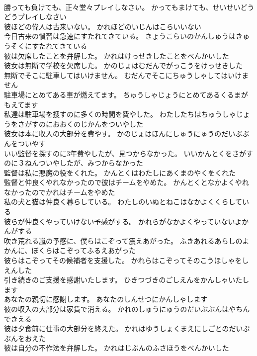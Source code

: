 \documentclass[8pt]{extreport}
\begin{document}
\begin{CJK}{UTF8}{min}
\\	勝っても負けても、正々堂々プレイしなさい。	かってもまけても、せいせいどうどうプレイしなさい 
\\	彼ほどの偉人は古来いない。	かれほどのいじんはこらいいない 
\\	今日古来の慣習は急速にすたれてきている。	きょうこらいのかんしゅうはきゅうそくにすたれてきている 
\\	彼は欠席したことを弁解した。	かれはけっせきしたことをべんかいした 
\\	彼女は無断で学校を欠席した。	かのじょはむだんでがっこうをけっせきした 
\\	無断でそこに駐車してはいけません。	むだんでそこにちゅうしゃしてはいけません 
\\	駐車場にとめてある車が燃えてます。	ちゅうしゃじょうにとめてあるくるまがもえてます 
\\	私達は駐車場を捜すのに多くの時間を費やした。	わたしたちはちゅうしゃじょうをさがすのにおおくのじかんをついやした 
\\	彼女は本に収入の大部分を費やす。	かのじょはほんにしゅうにゅうのだいぶぶんをついやす 
\\	いい監督を探すのに3年費やしたが、見つからなかった。	いいかんとくをさがすのに３ねんついやしたが、みつからなかった 
\\	監督は私に悪魔の役をくれた。	かんとくはわたしにあくまのやくをくれた 
\\	監督と仲良くやれなかったので彼はチームをやめた。	かんとくとなかよくやれなかったのでかれはチームをやめた 
\\	私の犬と猫は仲良く暮らしている。	わたしのいぬとねこはなかよくくらしている 
\\	彼らが仲良くやっていけない予感がする。	かれらがなかよくやっていないよかんがする 
\\	吹き荒れる嵐の予感に、僕らはこぞって震えあがった。	ふきあれるあらしのよかんに、ぼくらはこぞってふるえあがった 
\\	彼らはこぞってその候補者を支援した。	かれらはこぞってそのこうほしゃをしえんした 
\\	引き続きのご支援を感謝いたします。	ひきつづきのごしえんをかんしゃいたします 
\\	あなたの親切に感謝します。	あなたのしんせつにかんしゃします 
\\	彼の収入の大部分は家賃で消える。	かれのしゅうにゅうのだいぶぶんはやちんできえる 
\\	彼は夕食前に仕事の大部分を終えた。	かれはゆうしょくまえにしごとのだいぶぶんをおえた 
\\	彼は自分の不作法を弁解した。	かれはじぶんのふさほうをべんかいした 

\end{CJK}
\end{document}
